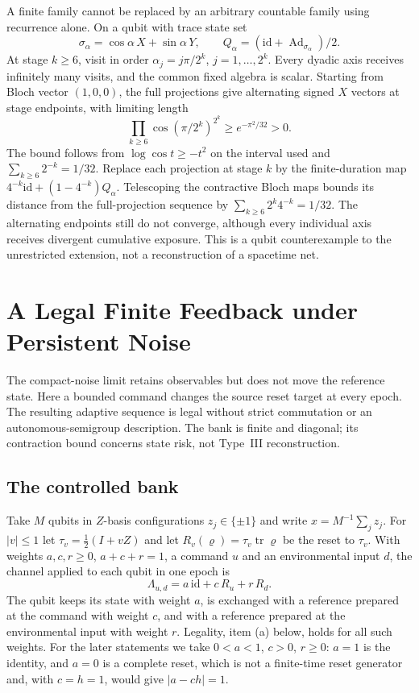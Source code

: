 \documentclass[12pt]{article}
\theoremstyle{definition}
\theoremstyle{remark}
\begin{document}
A finite family cannot be replaced by an arbitrary countable
family using recurrence alone. On a qubit with trace state set
\[
 \sigma_\alpha=\cos\alpha\,X+\sin\alpha\,Y,\qquad
 Q_\alpha=(\mathrm{id}+\operatorname{Ad}_{\sigma_\alpha})/2 .
\]
At stage \(k\ge6\), visit in order
\(\alpha_j=j\pi/2^k\), \(j=1,\ldots,2^k\).
Every dyadic axis receives infinitely many visits, and the
common fixed algebra is scalar. Starting from Bloch vector
\((1,0,0)\), the full projections give alternating signed \(X\)
vectors at stage endpoints, with limiting length
\[
 \prod_{k\ge6}\cos(\pi/2^k)^{2^k}
 \ge e^{-\pi^2/32}>0 .
\]
The bound follows from \(\log\cos t\ge-t^2\) on the interval used
and \(\sum_{k\ge6}2^{-k}=1/32\).
Replace each projection at stage \(k\) by the finite-duration map
\(4^{-k}\mathrm{id}+(1-4^{-k})Q_\alpha\).
Telescoping the contractive Bloch maps bounds its distance from
the full-projection sequence by
\(\sum_{k\ge6}2^k4^{-k}=1/32\).
The alternating endpoints still do not converge, although every
individual axis receives divergent cumulative exposure.
This is a qubit counterexample to the unrestricted extension,
not a reconstruction of a spacetime net.

\section{A Legal Finite Feedback under Persistent Noise}\label{sec:bank}

The compact-noise limit retains observables but does not move the
reference state. Here a bounded command changes the source reset
target at every epoch. The resulting adaptive sequence is legal
without strict commutation or an autonomous-semigroup description.
The bank is finite and diagonal; its contraction bound concerns
state risk, not Type~III reconstruction.

\subsection{The controlled bank}\label{subsec:bank_def}

Take $M$ qubits in $Z$-basis configurations $z_j\in\{\pm1\}$ and write $x=M^{-1}\sum_jz_j$. For $|v|\le1$ let $\tau_v=\tfrac12(I+vZ)$ and let $R_v(\varrho)=\tau_v\operatorname{tr}\varrho$ be the reset to $\tau_v$. With weights $a,c,r\ge0$, $a+c+r=1$, a command $u$ and an environmental input $d$, the channel applied to each qubit in one epoch is
\begin{equation}\label{eq:bank_channel}
\Lambda_{u,d}=a\,\mathrm{id}+c\,R_u+r\,R_d .
\end{equation}
The qubit keeps its state with weight $a$, is exchanged with a reference prepared at the command with weight $c$, and with a reference prepared at the environmental input with weight $r$. Legality, item (a) below, holds for all such weights. For the later statements we take $0<a<1$, $c>0$, $r\ge0$: $a=1$ is the identity, and $a=0$ is a complete reset, which is not a finite-time reset generator and, with $c=h=1$, would give $|a-ch|=1$.
\end{document}
